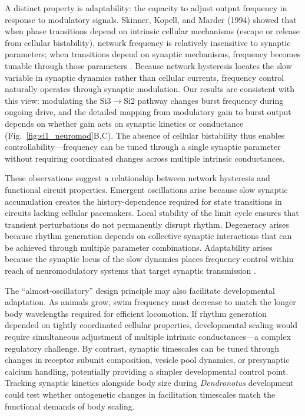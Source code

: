 A distinct property is adaptability: the capacity to adjust output frequency in response to modulatory signals.
Skinner, Kopell, and Marder (1994) showed that when phase transitions depend on intrinsic cellular mechanisms (escape or release from cellular bistability), network frequency is relatively insensitive to synaptic parameters; when transitions depend on synaptic mechanisms, frequency becomes tunable through those parameters \cite{SKM94}.
Because network hysteresis locates the slow variable in synaptic dynamics rather than cellular currents, frequency control naturally operates through synaptic modulation.
Our results are consistent with this view: modulating the Si3$\to$Si2 pathway changes burst frequency during ongoing drive, and the detailed mapping from modulatory gain to burst output depends on whether gain acts on synaptic kinetics or conductance (Fig.~\ref{fig:si1_neuromod}B,C).
The absence of cellular bistability thus enables controllability---frequency can be tuned through a single synaptic parameter without requiring coordinated changes across multiple intrinsic conductances.

These observations suggest a relationship between network hysteresis and functional circuit properties.
Emergent oscillations arise because slow synaptic accumulation creates the history-dependence required for state transitions in circuits lacking cellular pacemakers.
Local stability of the limit cycle ensures that transient perturbations do not permanently disrupt rhythm.
Degeneracy arises because rhythm generation depends on collective synaptic interactions that can be achieved through multiple parameter combinations.
Adaptability arises because the synaptic locus of the slow dynamics places frequency control within reach of neuromodulatory systems that target synaptic transmission \cite{NadimBucher2014}.

The ``almost-oscillatory'' design principle may also facilitate developmental adaptation.
As animals grow, swim frequency must decrease to match the longer body wavelengths required for efficient locomotion.
If rhythm generation depended on tightly coordinated cellular properties, developmental scaling would require simultaneous adjustment of multiple intrinsic conductances---a complex regulatory challenge.
By contrast, synaptic timescales can be tuned through changes in receptor subunit composition, vesicle pool dynamics, or presynaptic calcium handling, potentially providing a simpler developmental control point.
Tracking synaptic kinetics alongside body size during \textit{Dendronotus} development could test whether ontogenetic changes in facilitation timescales match the functional demands of body scaling.

